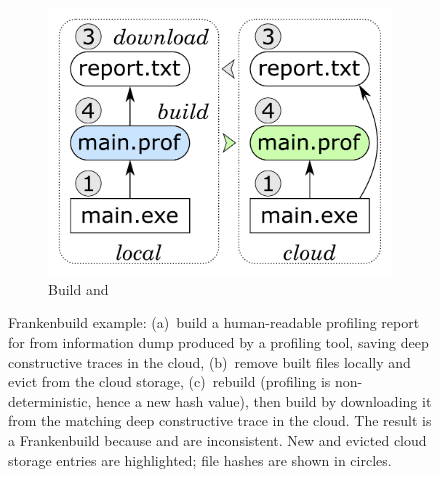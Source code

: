 \begin{figure}
\begin{subfigure}[b]{0.31\linewidth}
\end{subfigure}
\begin{subfigure}[b]{0.36\linewidth}
\centerline{\includegraphics[scale=0.27]{fig/frankenbuild-example-rebuild.pdf}}
\caption{Build  and }
\end{subfigure}
\vspace{-1mm}
\caption{Frankenbuild example: (a)~build a human-readable profiling report for
 from information dump  produced by a profiling
tool, saving deep constructive traces in the cloud, (b)~remove built files
locally and evict  from the cloud storage, (c)~rebuild
 (profiling is non-deterministic, hence a new hash value), then
build  by downloading it from the matching deep constructive
trace in the cloud. The result is a Frankenbuild because  and
 are inconsistent. New and evicted cloud storage entries are
highlighted; file hashes are shown in circles.
\label{fig-frankenbuild}}
\end{figure}

